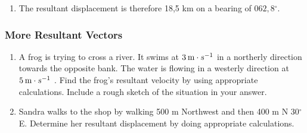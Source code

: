{\begin{mdframed}[linewidth=4, leftmargin=40, rightmargin=40]
\begin{exercise}
\begin{enumerate}[noitemsep, label=\textbf{Step} \textbf{\arabic*}. ]
          
          \label{m38816*id192636}To find \begin{math}F\stackrel{\mbox{\textasciicircum{}}}{A}C\end{math}, we add \begin{math}45{}^{\circ }\end{math}.
Thus, \begin{math}F\stackrel{\mbox{\textasciicircum{}}}{A}C=62,{8}^{\circ }\end{math}.\par 
          \item  
          \label{m38816*id192715}The resultant displacement is therefore 18,5 km on a bearing of \begin{math}062,8{}^{\circ }\end{math}. \par 
          \end{enumerate}
         

    \end{exercise}
    \end{mdframed}
    }
    \noindent
  
\label{m38816*secfhsst!!!underscore!!!id1948}
            \subsubsection{  More Resultant Vectors }
            \nopagebreak
            
          \label{m38816*id192751}\begin{enumerate}[noitemsep, label=\textbf{\arabic*}. ] 
            \label{m38816*uid66}\item A frog is trying to cross a river. It swims at \begin{math}3\phantom{\rule{2pt}{0ex}}\mathrm{m}\ensuremath{\cdot}s{}^{-1}\end{math} in a northerly direction towards the opposite bank. The water is flowing in a westerly direction at \begin{math}5\phantom{\rule{2pt}{0ex}}\mathrm{m}\ensuremath{\cdot}s{}^{-1}\end{math} . Find the frog's resultant velocity by using appropriate calculations. Include a rough sketch of the situation in your answer.\newline
            
\label{m38816*uid67}\item Sandra walks to the shop by walking 500 m Northwest and then 400 m N \begin{math}30{}^{\circ }\end{math} E. Determine her resultant displacement by doing appropriate calculations.\newline
            
\end{enumerate}
        
